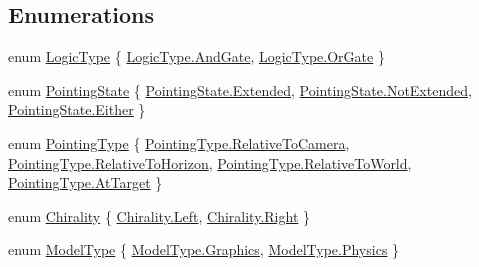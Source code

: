 \subsection*{Enumerations}
\begin{DoxyCompactItemize}
\item 
enum \mbox{\hyperlink{namespace_leap_1_1_unity_a77852b6f4a12b4cff02c45dd93e7b2b1}{Logic\+Type}} \{ \mbox{\hyperlink{namespace_leap_1_1_unity_a77852b6f4a12b4cff02c45dd93e7b2b1a296b4d7851ca3e55bce82683249c4d0e}{Logic\+Type.\+And\+Gate}}, 
\mbox{\hyperlink{namespace_leap_1_1_unity_a77852b6f4a12b4cff02c45dd93e7b2b1a648ae48d4b4163761295a179ba20388f}{Logic\+Type.\+Or\+Gate}}
 \}
\item 
enum \mbox{\hyperlink{namespace_leap_1_1_unity_a1d316bf483102971171646a20de176fc}{Pointing\+State}} \{ \mbox{\hyperlink{namespace_leap_1_1_unity_a1d316bf483102971171646a20de176fcaf23578fcd2a868168854ab714e7de537}{Pointing\+State.\+Extended}}, 
\mbox{\hyperlink{namespace_leap_1_1_unity_a1d316bf483102971171646a20de176fca8eff020959c41ba903e16d966855ce03}{Pointing\+State.\+Not\+Extended}}, 
\mbox{\hyperlink{namespace_leap_1_1_unity_a1d316bf483102971171646a20de176fca9e70a5d3dab1960c04b55a29f310331e}{Pointing\+State.\+Either}}
 \}
\item 
enum \mbox{\hyperlink{namespace_leap_1_1_unity_a34b9e7741bfe47e7a9b1c2bffbe7f4cf}{Pointing\+Type}} \{ \mbox{\hyperlink{namespace_leap_1_1_unity_a34b9e7741bfe47e7a9b1c2bffbe7f4cfaa434e559bd52b1023e70404ccd5cb90e}{Pointing\+Type.\+Relative\+To\+Camera}}, 
\mbox{\hyperlink{namespace_leap_1_1_unity_a34b9e7741bfe47e7a9b1c2bffbe7f4cfa31999ab3e9ca81aefc5d2bc9c075f580}{Pointing\+Type.\+Relative\+To\+Horizon}}, 
\mbox{\hyperlink{namespace_leap_1_1_unity_a34b9e7741bfe47e7a9b1c2bffbe7f4cfab8085d9250dafabc6a770fad10bf57ea}{Pointing\+Type.\+Relative\+To\+World}}, 
\mbox{\hyperlink{namespace_leap_1_1_unity_a34b9e7741bfe47e7a9b1c2bffbe7f4cfa86f496d1df6da0c35f78658b6fd2e89e}{Pointing\+Type.\+At\+Target}}
 \}
\item 
enum \mbox{\hyperlink{namespace_leap_1_1_unity_a4d15adcf20ba121b2cd9c07f503b606f}{Chirality}} \{ \mbox{\hyperlink{namespace_leap_1_1_unity_a4d15adcf20ba121b2cd9c07f503b606fa945d5e233cf7d6240f6b783b36a374ff}{Chirality.\+Left}}, 
\mbox{\hyperlink{namespace_leap_1_1_unity_a4d15adcf20ba121b2cd9c07f503b606fa92b09c7c48c520c3c55e497875da437c}{Chirality.\+Right}}
 \}
\item 
enum \mbox{\hyperlink{namespace_leap_1_1_unity_a186e5eb0a2b743f1f6b79346f0ab8ad0}{Model\+Type}} \{ \mbox{\hyperlink{namespace_leap_1_1_unity_a186e5eb0a2b743f1f6b79346f0ab8ad0ad334dfcea59127bedfcdbe0a3ee7f494}{Model\+Type.\+Graphics}}, 
\mbox{\hyperlink{namespace_leap_1_1_unity_a186e5eb0a2b743f1f6b79346f0ab8ad0a50ae99e9c35446c2580e4b540b0fd104}{Model\+Type.\+Physics}}
 \}
\end{DoxyCompactItemize}


